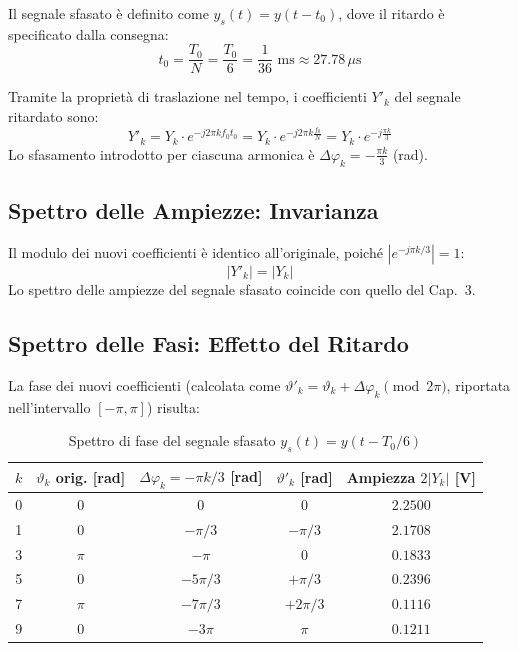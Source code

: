 Il segnale sfasato è definito come $y_s(t) = y(t - t_0)$, dove il ritardo è specificato dalla consegna:
\begin{equation}
    t_0 = \frac{T_0}{N} = \frac{T_0}{6} = \frac{1}{36}\text{ ms} \approx 27.78\,\mu\text{s}
\end{equation}

Tramite la proprietà di traslazione nel tempo, i coefficienti $Y'_k$ del segnale ritardato sono:
\begin{equation}
    Y'_k = Y_k \cdot e^{-j 2\pi k f_0 t_0} = Y_k \cdot e^{-j 2\pi k \frac{f_0}{N}} = Y_k \cdot e^{-j\frac{\pi k}{3}}
\end{equation}
Lo sfasamento introdotto per ciascuna armonica è $\Delta\varphi_k = -\frac{\pi k}{3}$ (rad).

\subsection{Spettro delle Ampiezze: Invarianza}
Il modulo dei nuovi coefficienti è identico all'originale, poiché $|e^{-j\pi k/3}| = 1$:
\[ |Y'_k| = |Y_k| \]
Lo spettro delle ampiezze del segnale sfasato coincide con quello del Cap.~3.

\subsection{Spettro delle Fasi: Effetto del Ritardo}
La fase dei nuovi coefficienti (calcolata come $\vartheta'_k = \vartheta_k + \Delta\varphi_k \pmod{2\pi}$, riportata nell'intervallo $[-\pi, \pi]$) risulta:

\begin{table}[h]
    \centering
    \begin{tabular}{|c|c|c|c|c|}
        \hline
        $k$ & $\vartheta_k$ orig. [rad] & $\Delta\varphi_k = -\pi k/3$ [rad] & $\vartheta'_k$ [rad] & Ampiezza $2|Y_k|$ [V] \\
        \hline
        0   & $0$                       & $0$                                & $0$                  & $2.2500$              \\
        1   & $0$                       & $-\pi/3$                           & $-\pi/3$             & $2.1708$              \\
        3   & $\pi$                     & $-\pi$                             & $0$                  & $0.1833$              \\
        5   & $0$                       & $-5\pi/3$                          & $+\pi/3$             & $0.2396$              \\
        7   & $\pi$                     & $-7\pi/3$                          & $+2\pi/3$            & $0.1116$              \\
        9   & $0$                       & $-3\pi$                            & $\pi$                & $0.1211$              \\
        \hline
    \end{tabular}
    \caption{Spettro di fase del segnale sfasato $y_s(t) = y(t - T_0/6)$}
\end{table}

